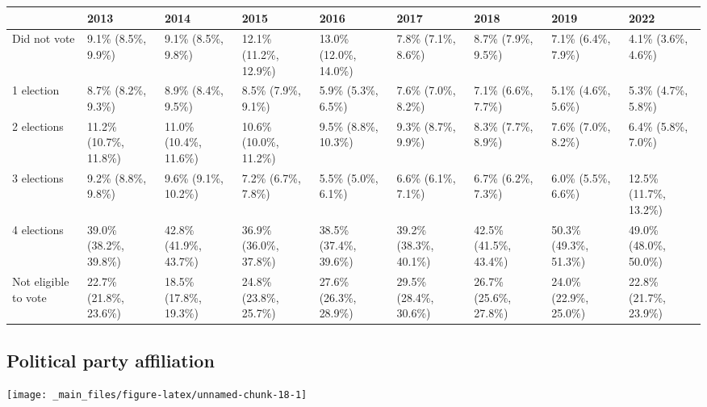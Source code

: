 \documentclass[
]{book}
\begin{document}
\begin{table}
\centering
\begin{tabular}[t]{>{}l|>{}l|>{}l|>{}l|>{}l|>{}l|>{}l|>{}l|>{}l}
\hline
  & 2013 & 2014 & 2015 & 2016 & 2017 & 2018 & 2019 & 2022\\
\hline
Did not vote & 9.1\% (8.5\%, 9.9\%) & 9.1\% (8.5\%, 9.8\%) & 12.1\% (11.2\%, 12.9\%) & 13.0\% (12.0\%, 14.0\%) & 7.8\% (7.1\%, 8.6\%) & 8.7\% (7.9\%, 9.5\%) & 7.1\% (6.4\%, 7.9\%) & 4.1\% (3.6\%, 4.6\%)\\
\hline
1 election & 8.7\% (8.2\%, 9.3\%) & 8.9\% (8.4\%, 9.5\%) & 8.5\% (7.9\%, 9.1\%) & 5.9\% (5.3\%, 6.5\%) & 7.6\% (7.0\%, 8.2\%) & 7.1\% (6.6\%, 7.7\%) & 5.1\% (4.6\%, 5.6\%) & 5.3\% (4.7\%, 5.8\%)\\
\hline
2 elections & 11.2\% (10.7\%, 11.8\%) & 11.0\% (10.4\%, 11.6\%) & 10.6\% (10.0\%, 11.2\%) & 9.5\% (8.8\%, 10.3\%) & 9.3\% (8.7\%, 9.9\%) & 8.3\% (7.7\%, 8.9\%) & 7.6\% (7.0\%, 8.2\%) & 6.4\% (5.8\%, 7.0\%)\\
\hline
3 elections & 9.2\% (8.8\%, 9.8\%) & 9.6\% (9.1\%, 10.2\%) & 7.2\% (6.7\%, 7.8\%) & 5.5\% (5.0\%, 6.1\%) & 6.6\% (6.1\%, 7.1\%) & 6.7\% (6.2\%, 7.3\%) & 6.0\% (5.5\%, 6.6\%) & 12.5\% (11.7\%, 13.2\%)\\
\hline
4 elections & 39.0\% (38.2\%, 39.8\%) & 42.8\% (41.9\%, 43.7\%) & 36.9\% (36.0\%, 37.8\%) & 38.5\% (37.4\%, 39.6\%) & 39.2\% (38.3\%, 40.1\%) & 42.5\% (41.5\%, 43.4\%) & 50.3\% (49.3\%, 51.3\%) & 49.0\% (48.0\%, 50.0\%)\\
\hline
Not eligible to vote & 22.7\% (21.8\%, 23.6\%) & 18.5\% (17.8\%, 19.3\%) & 24.8\% (23.8\%, 25.7\%) & 27.6\% (26.3\%, 28.9\%) & 29.5\% (28.4\%, 30.6\%) & 26.7\% (25.6\%, 27.8\%) & 24.0\% (22.9\%, 25.0\%) & 22.8\% (21.7\%, 23.9\%)\\
\hline
\end{tabular}
\end{table}

\hypertarget{political-party-affiliation}{%
\subsection{Political party affiliation}\label{political-party-affiliation}}

\texttt{[image: \_main\_files/figure-latex/unnamed-chunk-18-1]}
\end{document}
